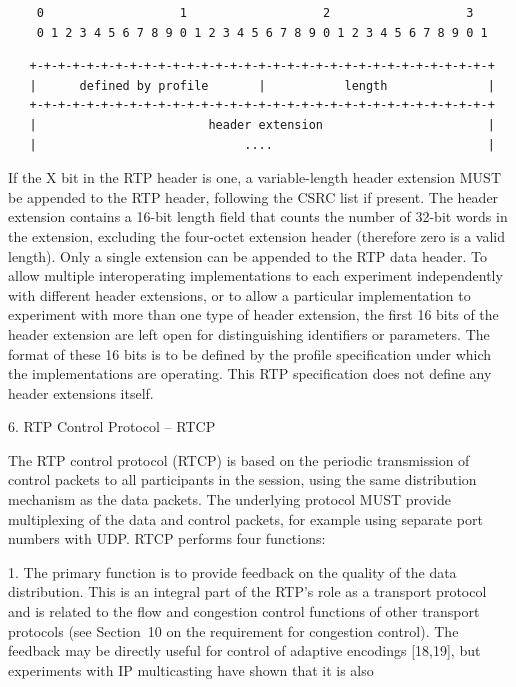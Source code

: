 \documentclass{article}
\begin{document}
\begin{verbatim}
    0                   1                   2                   3
    0 1 2 3 4 5 6 7 8 9 0 1 2 3 4 5 6 7 8 9 0 1 2 3 4 5 6 7 8 9 0 1
\end{verbatim}

\begin{verbatim}
   +-+-+-+-+-+-+-+-+-+-+-+-+-+-+-+-+-+-+-+-+-+-+-+-+-+-+-+-+-+-+-+-+
   |      defined by profile       |           length              |
   +-+-+-+-+-+-+-+-+-+-+-+-+-+-+-+-+-+-+-+-+-+-+-+-+-+-+-+-+-+-+-+-+
   |                        header extension                       |
   |                             ....                              |
\end{verbatim}

If the X bit in the RTP header is one, a variable-length header extension MUST be appended to the RTP header, following the CSRC list if present.  The header extension contains a 16-bit length field that counts the number of 32-bit words in the extension, excluding the four-octet extension header (therefore zero is a valid length).  Only a single extension can be appended to the RTP data header.  To allow multiple interoperating implementations to each experiment independently with different header extensions, or to allow a particular implementation to experiment with more than one type of header extension, the first 16 bits of the header extension are left open for distinguishing identifiers or parameters.  The format of these 16 bits is to be defined by the profile specification under which the implementations are operating.  This RTP specification does not define any header extensions itself.

6. RTP Control Protocol -- RTCP

The RTP control protocol (RTCP) is based on the periodic transmission of control packets to all participants in the session, using the same distribution mechanism as the data packets.  The underlying protocol MUST provide multiplexing of the data and control packets, for example using separate port numbers with UDP.  RTCP performs four functions:

1. The primary function is to provide feedback on the quality of the data distribution.  This is an integral part of the RTP's role as a transport protocol and is related to the flow and congestion control functions of other transport protocols (see Section~10 on the requirement for congestion control).  The feedback may be directly useful for control of adaptive encodings [18,19], but experiments with IP multicasting have shown that it is also
\end{document}
